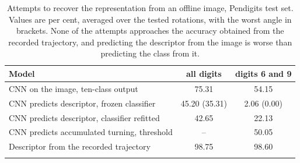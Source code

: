 \begin{table}[t]
\caption{Attempts to recover the representation from an offline image, Pendigits
test set. Values are per cent, averaged over the tested rotations, with the worst
angle in brackets. None of the attempts approaches the accuracy obtained from the
recorded trajectory, and predicting the descriptor from the image is worse than
predicting the class from it.}
\label{tab:offline}
\begin{tabular}{lcc}
\toprule
Model & all digits & digits 6 and 9\\
\midrule
CNN on the image, ten-class output & 75.31 & 54.15\\
CNN predicts descriptor, frozen classifier & 45.20 (35.31) & 2.06 (0.00)\\
CNN predicts descriptor, classifier refitted & 42.65 & 22.13\\
CNN predicts accumulated turning, threshold & -- & 50.05\\
\midrule
Descriptor from the recorded trajectory & 98.75 & 98.60\\
\botrule
\end{tabular}
\end{table}
